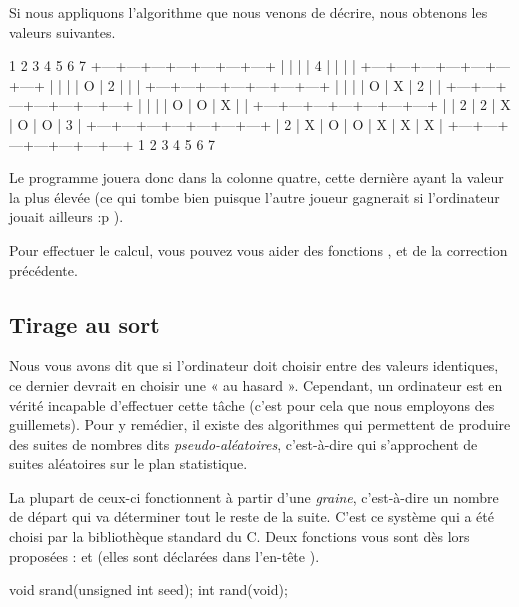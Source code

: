 Si nous appliquons l'algorithme que nous venons de décrire,
nous ob\-te\-nons les valeurs suivantes.

\begin{C}
  1   2   3   4   5   6   7  
+---+---+---+---+---+---+---+
|   |   |   | 4 |   |   |   |
+---+---+---+---+---+---+---+
|   |   |   | O | 2 |   |   |
+---+---+---+---+---+---+---+
|   |   |   | O | X | 2 |   |
+---+---+---+---+---+---+---+
|   |   |   | O | O | X |   |
+---+---+---+---+---+---+---+
|   | 2 | 2 | X | O | O | 3 |
+---+---+---+---+---+---+---+
| 2 | X | O | O | X | X | X |
+---+---+---+---+---+---+---+
  1   2   3   4   5   6   7  
\end{C}

Le programme jouera donc dans la colonne quatre, cette dernière ayant la
valeur la plus élevée (ce qui tombe bien puisque l'autre joueur
gagnerait si l'ordinateur jouait ailleurs :p ).

\begin{infobox}
  Pour effectuer le calcul, vous pouvez
vous aider des fonctions ,
 et  de la correction
précédente.
\end{infobox}


\subsection{Tirage au sort}
\label{tirage-au-sort}

Nous vous avons dit que si l'ordinateur doit choisir entre des valeurs
identiques, ce dernier devrait en choisir une « au hasard ». Cependant,
un ordinateur est en vérité incapable d'effectuer cette tâche (c'est
pour cela que nous employons des guillemets). Pour y remédier, il existe
des algorithmes qui permettent de produire des suites de nombres dits
\emph{pseudo-aléatoires}, c'est-à-dire qui s'approchent de suites
aléatoires sur le plan statistique.

La plupart de ceux-ci fonctionnent à partir d'une \emph{graine},
c'est-à-dire un nombre de départ qui va déterminer tout le reste de la
suite. C'est ce système qui a été choisi par la bibliothèque standard du
C. Deux fonctions vous sont dès lors proposées :  et
 (elles sont déclarées dans l'en-tête
).

\begin{C}
void srand(unsigned int seed);
int rand(void);
\end{C}

